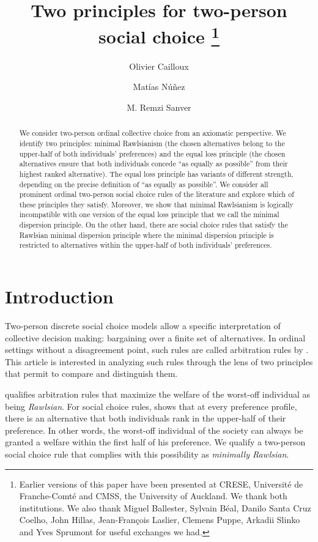 \documentclass[pagesize, twoside=off, bibliography=totoc, DIV=calc, fontsize=12pt, a4paper]{scrartcl}
\title{Two principles for two-person social choice \thanks{Earlier versions of this paper have been presented at CRESE, Université de Franche-Comté and CMSS, the University of Auckland. We thank both institutions. We also thank Miguel Ballester, Sylvain Béal, Danilo Santa Cruz Coelho, John Hillas, Jean-François Laslier, Clemens Puppe, Arkadii Slinko and Yves Sprumont for useful exchanges we had.}}
\author[*]{Olivier Cailloux}
\author[**]{Matías Núñez}
\author[*]{M. Remzi Sanver}
\affil[*]{Université Paris-Dauphine, PSL Research University, CNRS, LAMSADE, 75016 Paris, France.}
\affil[**]{CREST, CNRS, École Polytechnique, GENES, ENSAE Paris, Institut Polytechnique de Paris, 91120 Palaiseau, France.}
\date{}
\begin{document}
\maketitle

\begin{abstract}
  We consider two-person ordinal collective choice from an axiomatic perspective. We identify two principles: minimal Rawlsianism (the chosen alternatives belong to the upper-half of both individuals’ preferences) and the equal loss principle (the chosen alternatives ensure that both individuals concede “as equally as possible” from their highest ranked alternative). The equal loss principle has variants of different strength, depending on the precise definition of “as equally as possible”. We consider all prominent ordinal two-person social choice rules of the literature and explore which of these principles they satisfy. Moreover, we show that minimal Rawlsianism is logically incompatible with one version of the equal loss principle that we call the minimal dispersion principle. On the other hand, there are social choice rules that satisfy the Rawlsian minimal dispersion principle where the minimal dispersion principle is restricted to alternatives within the upper-half of both individuals’ preferences.
\end{abstract}

\section{Introduction}
\label{sec:intro}
Two-person discrete social choice models allow a specific interpretation of collective decision making: bargaining over a finite set of alternatives.
In ordinal settings without a disagreement point, such rules are called arbitration rules by \citet{Sprumont1993}. This article is interested in analyzing such rules through the lens of two principles that permit to compare and distinguish them.

\citet{Sprumont1993} qualifies arbitration rules that maximize the welfare of the worst-off individual as being \textit{Rawlsian}. For social choice rules, \citet{BramsKilgour2001} shows that at every preference profile, there is an alternative that both individuals rank in the upper-half of their preference. In other words, the  worst-off individual of the society can always be granted a welfare within the first half of his preference.
We qualify a two-person social choice rule that complies with this possibility as \textit{minimally Rawlsian}.
\end{document}
